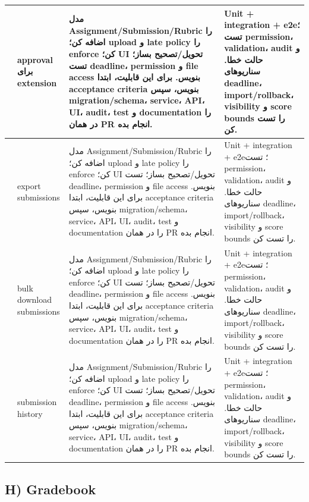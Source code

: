 \documentclass[11pt,a4paper]{article}
\begin{document}
\begin{longtable}{|>{\raggedleft\arraybackslash}p{}|>{\raggedleft\arraybackslash}p{}|>{\raggedleft\arraybackslash}p{}|>{\raggedleft\arraybackslash}p{}|}
117 & approval برای extension & مدل Assignment/Submission/Rubric را اضافه کن؛ upload و late policy را enforce کن؛ UI تحویل/تصحیح بساز؛ تست deadline، permission و file access بنویس. برای این قابلیت، ابتدا acceptance criteria بنویس، سپس migration/schema، service، API، UI، audit، test و documentation را در همان PR انجام بده. & Unit + integration + e2e؛ تست permission، validation، audit و حالت خطا. سناریوهای deadline، import/rollback، visibility و score bounds را تست کن. \\ \hline
118 & export submissions & مدل Assignment/Submission/Rubric را اضافه کن؛ upload و late policy را enforce کن؛ UI تحویل/تصحیح بساز؛ تست deadline، permission و file access بنویس. برای این قابلیت، ابتدا acceptance criteria بنویس، سپس migration/schema، service، API، UI، audit، test و documentation را در همان PR انجام بده. & Unit + integration + e2e؛ تست permission، validation، audit و حالت خطا. سناریوهای deadline، import/rollback، visibility و score bounds را تست کن. \\ \hline
119 & bulk download submissions & مدل Assignment/Submission/Rubric را اضافه کن؛ upload و late policy را enforce کن؛ UI تحویل/تصحیح بساز؛ تست deadline، permission و file access بنویس. برای این قابلیت، ابتدا acceptance criteria بنویس، سپس migration/schema، service، API، UI، audit، test و documentation را در همان PR انجام بده. & Unit + integration + e2e؛ تست permission، validation، audit و حالت خطا. سناریوهای deadline، import/rollback، visibility و score bounds را تست کن. \\ \hline
120 & submission history & مدل Assignment/Submission/Rubric را اضافه کن؛ upload و late policy را enforce کن؛ UI تحویل/تصحیح بساز؛ تست deadline، permission و file access بنویس. برای این قابلیت، ابتدا acceptance criteria بنویس، سپس migration/schema، service، API، UI، audit، test و documentation را در همان PR انجام بده. & Unit + integration + e2e؛ تست permission، validation، audit و حالت خطا. سناریوهای deadline، import/rollback، visibility و score bounds را تست کن. \\ \hline
\end{longtable}
\subsection{H) Gradebook}
\end{document}
